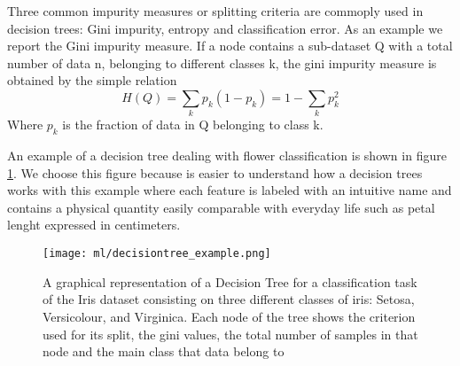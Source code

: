 \documentclass[11pt]{report}
\begin{document}


Three common impurity measures or splitting criteria are commoply used in decision trees: Gini impurity, entropy and classification error.
As an example we report the Gini impurity measure. If a node contains a sub-dataset Q with a total number of data n, belonging to different classes k, the gini impurity measure is obtained by the simple relation
\begin{equation}
H(Q)=\sum_k p_{k}(1-p_{k}) = 1- \sum_k p_k^2
\end{equation}
Where $p_k$ is the fraction of data in Q belonging to class k.

An example of a decision tree dealing with flower classification is shown in figure \ref{fig:decisiontree}.
We choose this figure because is easier to understand how a decision trees works with this example where each feature is labeled with an intuitive name and contains a physical quantity easily comparable with everyday life such as petal lenght expressed in centimeters.

\begin{figure}
\centering
\texttt{[image: ml/decisiontree\_example.png]}
\caption{A graphical representation of a Decision Tree for a classification task of the Iris dataset consisting on three different classes of iris: Setosa, Versicolour, and Virginica. Each node of the tree shows the criterion used for its split, the gini values, the total number of samples in that node and the main class that data belong to}
\label{fig:decisiontree}
\end{figure}
\end{document}
